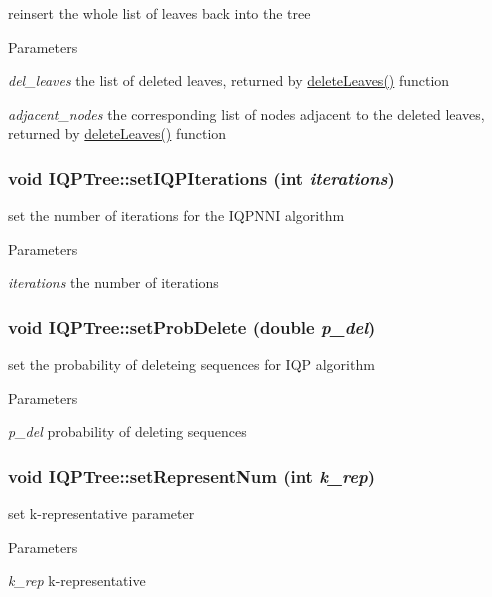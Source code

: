 \label{classIQPTree_a803d8f087733ff4c7d4b400c87b35cea}
reinsert the whole list of leaves back into the tree 
\begin{DoxyParams}{Parameters}
\item[{\em del\_\-leaves}]the list of deleted leaves, returned by \hyperlink{classIQPTree_a038522be23c6a8fef71a2a1ffa983976}{deleteLeaves()} function \item[{\em adjacent\_\-nodes}]the corresponding list of nodes adjacent to the deleted leaves, returned by \hyperlink{classIQPTree_a038522be23c6a8fef71a2a1ffa983976}{deleteLeaves()} function \end{DoxyParams}
\hypertarget{classIQPTree_a8e837502069fdce36da52ac029b5f1ff}{
\subsubsection[{setIQPIterations}]{\setlength{\rightskip}{0pt plus 5cm}void IQPTree::setIQPIterations (int {\em iterations})}}
\label{classIQPTree_a8e837502069fdce36da52ac029b5f1ff}
set the number of iterations for the IQPNNI algorithm 
\begin{DoxyParams}{Parameters}
\item[{\em iterations}]the number of iterations \end{DoxyParams}
\hypertarget{classIQPTree_a94b43e66444d6f5d8f6fec75ff708add}{
\subsubsection[{setProbDelete}]{\setlength{\rightskip}{0pt plus 5cm}void IQPTree::setProbDelete (double {\em p\_\-del})}}
\label{classIQPTree_a94b43e66444d6f5d8f6fec75ff708add}
set the probability of deleteing sequences for IQP algorithm 
\begin{DoxyParams}{Parameters}
\item[{\em p\_\-del}]probability of deleting sequences \end{DoxyParams}
\hypertarget{classIQPTree_aa77b4949058eb92e6179f9cfab2330d1}{
\subsubsection[{setRepresentNum}]{\setlength{\rightskip}{0pt plus 5cm}void IQPTree::setRepresentNum (int {\em k\_\-rep})}}
\label{classIQPTree_aa77b4949058eb92e6179f9cfab2330d1}
set k-\/representative parameter 
\begin{DoxyParams}{Parameters}
\item[{\em k\_\-rep}]k-\/representative \end{DoxyParams}


